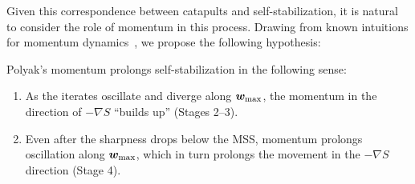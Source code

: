 Given this correspondence between catapults and self-stabilization, it is natural to consider the role of momentum in this process.
Drawing from known intuitions for momentum dynamics~\citep{goh2017momentum,pedregosa2023momentum,muhlebach2021momentum}, we propose the following hypothesis:
\begin{hypothesis}
\label{hypothesis}
    Polyak's momentum prolongs self-stabilization in the following sense:
    \begin{enumerate}
        \item \label{hyp:stage2-3}As the iterates oscillate and diverge along ${\bm{w}}_{\max}$, the momentum in the direction of $-\nabla S$ ``builds up'' (Stages 2--3).
        \item \label{hyp:stage4}Even after the sharpness drops below the MSS, momentum prolongs oscillation along ${\bm{w}}_{\max}$, which in turn prolongs the movement in the $-\nabla S$ direction (Stage 4).
    \end{enumerate}
\end{hypothesis}

